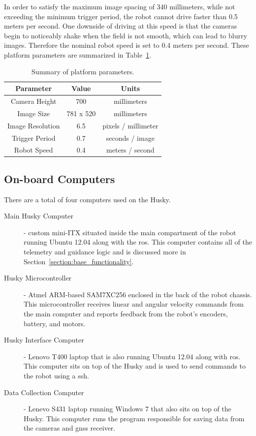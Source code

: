 In order to satisfy the maximum image spacing of 340 millimeters, while not exceeding the minimum trigger period, the robot cannot drive faster than 0.5 meters per second.  One downside of driving at this speed is that the cameras begin to noticeably shake when the field is not smooth, which can lead to blurry images.  Therefore the nominal robot speed is set to 0.4 meters per second.  These platform parameters are summarized in Table~\ref{table:platform_params}.

\begin{table}
    \begin{center}
    \caption{Summary of platform parameters.}
    \begin{tabular}[c]{|c|c|c|}
        \hline
        Parameter & Value & Units \\
        \hline
        Camera Height    & 700       & millimeters         \\
        Image Size       & 781 x 520 & millimeters         \\
        Image Resolution & 6.5       & pixels / millimeter \\
        Trigger Period   & 0.7       & seconds / image     \\
        Robot Speed      & 0.4       & meters / second     \\
        \hline
    \end{tabular}
    \label{table:platform_params}
   \end{center}
\end{table}

\subsection{On-board Computers}

There are a total of four computers used on the Husky.

\begin{description}
\item[Main Husky Computer] - custom mini-ITX situated inside the main compartment of the robot running Ubuntu 12.04 along with the \ac{ros}. This computer contains all of the telemetry and guidance logic and is discussed more in Section~\ref{section:base_functionality}.  
\item[Husky Microcontroller] - Atmel ARM-based SAM7XC256 enclosed in the back of the robot chassis.  This microcontroller receives linear and angular velocity commands from the main computer and reports feedback from the robot's encoders, battery, and motors. 
\item[Husky Interface Computer] - Lenovo T400 laptop that is also running Ubuntu 12.04 along with \ac{ros}.  This computer sits on top of the Husky and is used to send commands to the robot using a \ac{ssh}.
\item[Data Collection Computer] - Lenevo S431 laptop running Windows 7 that also sits on top of the Husky.  This computer runs the program responsible for saving data from the cameras and \ac{gnss} receiver.   
\end{description}

